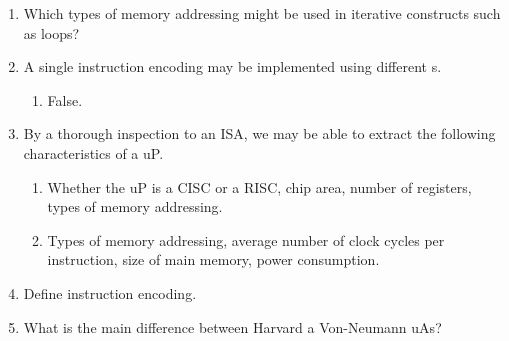 \documentclass[number=1]{exam}
\begin{document}
\begin{enumerate}
\item {} Which types of memory addressing might be used in iterative constructs such as  loops?

\item {} A single instruction encoding may be implemented using different \uA s.
\begin{enumerate}[label=\alph*)]
\item False.
\end{enumerate}

\item {} By a thorough inspection to an \acs{ISA}, we may be able to extract the following characteristics of a \acs{uP}.
\begin{enumerate}[label=\alph*)]
\item Whether the \acs{uP} is a \acs{CISC} or a \acs{RISC}, chip area, number of registers, types of memory addressing.
\item Types of memory addressing, average number of clock cycles per instruction, size of main memory, power consumption.
\end{enumerate}

\item {} Define instruction encoding.

\item {} What is the main difference between Harvard a Von-Neumann \acsp{uA}?


\end{enumerate}
\end{document}
